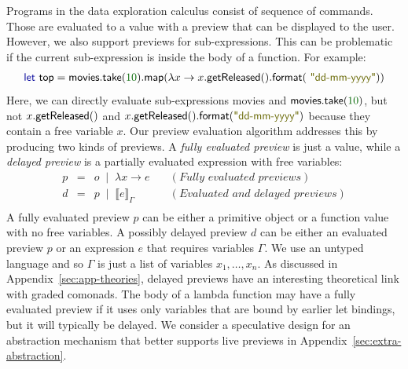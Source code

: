 \documentclass[english,submission]{programming}
\theoremstyle{plain}
\theoremstyle{definition}
\newcommand{\lsep}{\;\;|\;\;}
\newcommand{\num}[1]{\textcolor{numclr}{#1}}
\newcommand{\str}[1]{\textnormal{\textcolor{strclr}{\sffamily "#1"}}}
\newcommand{\ident}[1]{\textnormal{\textcolor{idclr}{\sffamily #1}}}
\newcommand{\kvd}[1]{\textnormal{\textcolor{kvdclr}{\sffamily #1}}}
\begin{document}
Programs in the data exploration calculus consist of sequence of commands. Those are
evaluated to a value with a preview that can be displayed to the user. However, we also support
previews for sub-expressions. This can be problematic if the current sub-expression is inside
the body of a function. For example:
%
\begin{equation*}
\begin{array}{l}
\kvd{let}~\ident{top} = \ident{movies}.\ident{take}(\num{10}).\ident{map}(\lambda x \rightarrow x.\ident{getReleased}().\ident{format}(\str{dd-mm-yyyy}))
\end{array}
\end{equation*}
%
Here, we can directly evaluate sub-expressions \ident{movies} and $\ident{movies}.\ident{take}(\num{10})$,
but not $x.\ident{getReleased}()$ and $x.\ident{getReleased}().\ident{format}(\str{dd-mm-yyyy})$
because they contain a free variable $x$. Our preview evaluation algorithm addresses this by
producing two kinds of previews. A \emph{fully evaluated preview} is just a value, while
a \emph{delayed preview} is a partially evaluated expression with free variables:
%
\begin{equation*}
\begin{array}{rcll}
p&=&o \lsep  \lambda x\rightarrow e&\quad(\textit{Fully evaluated previews})\\
d&=&p \lsep  \llbracket e \rrbracket_\Gamma&\quad(\textit{Evaluated and delayed previews})\\
\end{array}
\end{equation*}
%
A fully evaluated preview $p$ can be either a primitive object or a function value with no free
variables. A possibly delayed preview $d$ can be either an evaluated preview $p$ or an expression
$e$ that requires variables $\Gamma$. We use an untyped language and so $\Gamma$ is just a list of
variables $x_1, \ldots, x_n$. As discussed in Appendix~\ref{sec:app-theories},
delayed previews have an interesting theoretical link with graded comonads.
The body of a lambda function may have a fully evaluated preview if it uses only variables that
are bound by earlier let bindings, but it will typically be delayed. We consider a speculative
design for an abstraction mechanism that better supports live previews in
Appendix~\ref{sec:extra-abstraction}.

\end{document}
